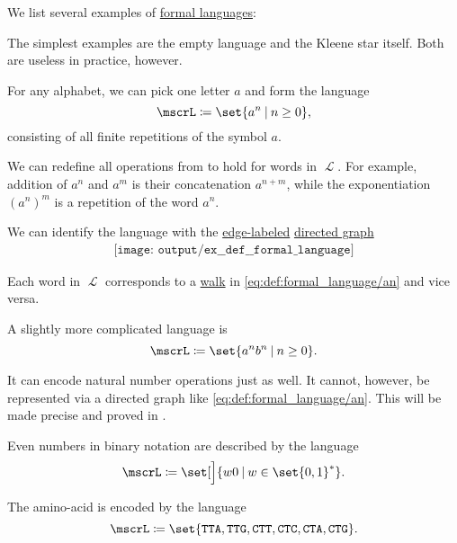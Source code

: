 \begin{example}\label{ex:def:formal_language}
  We list several examples of \hyperref[def:formal_language]{formal languages}:
  \begin{thmenum}
     The simplest examples are the empty language and the Kleene star itself. Both are useless in practice, however.

     For any alphabet, we can pick one letter \( a \) and form the language
    \begin{equation*}
      \mscrL \coloneqq \set{ a^n \given n \geq 0 },
    \end{equation*}
    consisting of all finite repetitions of the symbol \( a \).

    We can redefine all operations from  to hold for words in \( \mscrL \). For example, addition of \( a^n \) and \( a^m \) is their concatenation \( a^{n + m} \), while the exponentiation \( (a^n)^m \) is a repetition of the word \( a^n \).

    We can identify the language with the \hyperref[def:labeled_set]{edge-labeled} \hyperref[def:directed_graph]{directed graph}
    \begin{equation}\label{eq:def:formal_language/an}
      \begin{aligned}
        \texttt{[image: output/ex\_\_def\_\_formal\_language]}
      \end{aligned}
    \end{equation}

    Each word in \( \mscrL \) corresponds to a \hyperref[def:graph_walk/directed]{walk} in \eqref{eq:def:formal_language/an} and vice versa.

     A slightly more complicated language is
    \begin{equation*}
      \mscrL \coloneqq \set{ a^n b^n \given n \geq 0 }.
    \end{equation*}

    It can encode natural number operations just as well. It cannot, however, be represented via a directed graph like \eqref{eq:def:formal_language/an}. This will be made precise and proved in .

     Even numbers in binary notation are described by the language
    \begin{equation*}
      \mscrL \coloneqq \set[\Big]{ w0 \given w \in \set{ 0, 1 }^* }.
    \end{equation*}

     The  amino-acid is encoded by the language
    \begin{equation*}
       \mscrL \coloneqq \set{ \texttt{TTA}, \texttt{TTG}, \texttt{CTT}, \texttt{CTC}, \texttt{CTA}, \texttt{CTG} }.
    \end{equation*}
  \end{thmenum}
\end{example}

